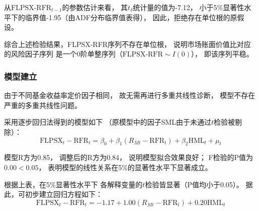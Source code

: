 \documentclass[UTF8]{ctexart}
\begin{document}
从$\text{FLPSX-RFR}_{t-1}$的参数估计来看，
其$t_{\delta}$统计量的值为-7.12，
小于5\%显著性水平下的临界值-1.95（由ADF分布临界值表得），
因此，拒绝存在单位根的原假设。

综合上述检验结果，FLPSX-RFR序列不存在单位根，
说明市场账面价值比对应的风险因子序列
是一个0阶单整序列（$\text{FLPSX-RFR} \sim I(0)$），
即该序列平稳。


\subsubsection{模型建立}

由于不同基金收益率定价因子相同，
故无需再进行多重共线性诊断，
模型不存在严重的多重共线性问题。

采用逐步回归法得到的模型如下
（原模型中的因子SML由于未通过$t$检验被剔除）：
\begin{equation}
  \text{FLPSX}_t-\mathrm{RFR}_t=\beta_0+\beta_1\left( R_{Mt}-\mathrm{RFR}_t \right)+\beta_2\mathrm{HML}_t + \mu_t
\end{equation}



模型R方为0.85，
调整后的R方为0.84，
说明模型拟合效果良好；
F检验的P值为$0.00<0.05$，
表明模型的线性关系在5\%的显著性水平下显著成立。

根据上表，在5\%显著性水平下
各解释变量的$t$检验皆显著（P值均小于0.05）。
据此，可初步建立回归方程如下：
\begin{equation}
  \text{FLPSX}_t-\mathrm{RFR}_t=-1.17+1.00\left( R_{Mt}-\mathrm{RFR}_t \right) +0.20\mathrm{HML}_t
\end{equation}
\end{document}

